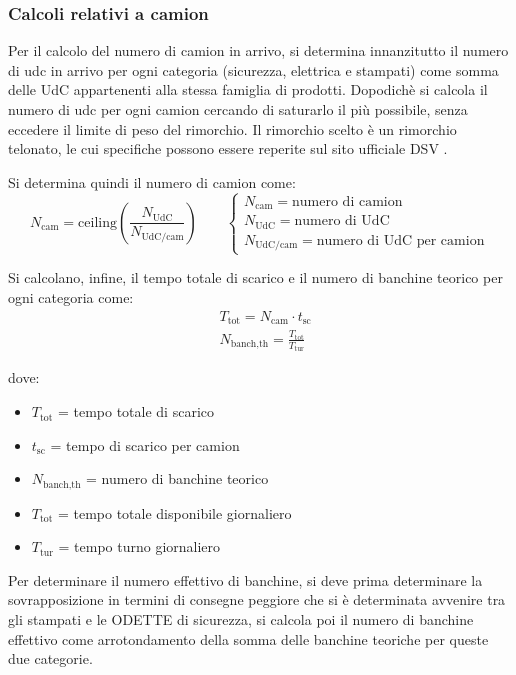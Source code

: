 \documentclass[11pt]{article}
\begin{document}
\subsubsection{Calcoli relativi a camion}
Per il calcolo del numero di camion in arrivo, si determina innanzitutto il numero di udc in arrivo per ogni categoria (sicurezza, elettrica e stampati) come somma delle UdC appartenenti alla stessa famiglia di prodotti.
Dopodichè si calcola il numero di udc per ogni camion cercando di saturarlo il più possibile, senza eccedere il limite di peso del rimorchio.
Il rimorchio scelto è un rimorchio telonato, le cui specifiche possono essere reperite sul sito ufficiale DSV \cite{dsv_trailer}.

\vskip1cm
\noindent
Si determina quindi il numero di camion come:
\begin{equation}
    N_\text{cam} = \text{ceiling}\left(\frac{N_\text{UdC}}{N_\text{UdC/cam}}\right)
    \qquad
    \begin{cases}
        N_\text{cam} = \text{numero di camion} \\
        N_\text{UdC} = \text{numero di UdC} \\
        N_\text{UdC/cam} = \text{numero di UdC per camion}
    \end{cases}
\end{equation}

\noindent
Si calcolano, infine, il tempo totale di scarico e il numero di banchine teorico per ogni categoria come:
\begin{align}
    & T_\text{tot} = N_\text{cam} \cdot t_\text{sc} \\
    & N_\text{banch,th} = \frac{T_\text{tot}}{T_\text{tur}}
\end{align}

\noindent
dove:
\begin{itemize}
    \item $T_\text{tot}$ = tempo totale di scarico
    \item $t_\text{sc}$ = tempo di scarico per camion
    \item $N_\text{banch,th}$ = numero di banchine teorico
    \item $T_\text{tot}$ = tempo totale disponibile giornaliero
    \item $T_\text{tur}$ = tempo turno giornaliero
\end{itemize}

Per determinare il numero effettivo di banchine, si deve prima determinare la sovrapposizione in termini di consegne peggiore che si è determinata avvenire tra gli stampati e le ODETTE di sicurezza, si calcola poi il numero di banchine effettivo come arrotondamento della somma delle banchine teoriche per queste due categorie.
\end{document}
